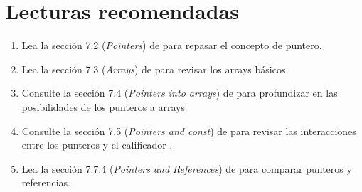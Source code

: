 \section{Lecturas recomendadas}

\begin{enumerate}

\item Lea la sección 7.2 (\emph{Pointers}) de
      \cppbook{}
      para repasar el concepto de puntero.

\item Lea la sección 7.3 (\emph{Arrays}) de
      \cppbook{}
      para revisar los arrays básicos.

\item Consulte la sección 7.4 (\emph{Pointers into arrays}) de
      \cppbook{}
      para profundizar en las posibilidades de los punteros a arrays

\item Consulte la sección 7.5 (\emph{Pointers and const}) de 
      \cppbook{}
      para revisar las interacciones entre los punteros y el calificador .

\item Lea la sección 7.7.4 (\emph{Pointers and References}) de
      \cppbook{}
      para comparar punteros y referencias.

\end{enumerate}
